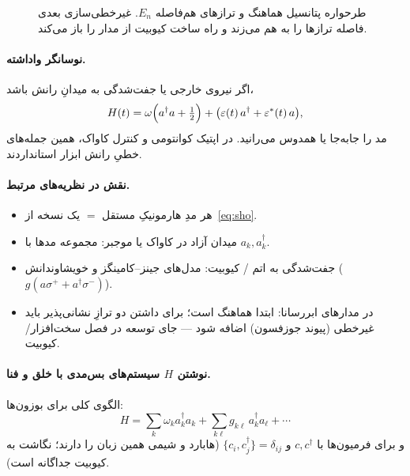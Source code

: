 \begin{figure}[htbp]
	\centering
	\begin{latin}
		\resizebox{0.55\textwidth}{!}{%
		}
	\end{latin}
	\caption{طرحواره پتانسیل هماهنگ و ترازهای هم‌فاصله $E_n$. غیرخطی‌سازی بعدی فاصله ترازها را به هم می‌زند و راه ساخت کیوبیت از مدار را باز می‌کند.}
	\label{fig:harmonic-osc}
\end{figure}

\paragraph{نوسانگر واداشته.}
اگر نیروی خارجی یا جفت‌شدگی به میدانِ رانش باشد،
\begin{equation}
	H(t)=\omega\Bigl(a^\dagger a+\tfrac12\Bigr)+\bigl(\varepsilon(t)\,a^\dagger+\varepsilon^*(t)\,a\bigr),
\end{equation}
مد را جابه‌جا یا همدوس می‌رانید. در اپتیک کوانتومی و کنترل کاواک، همین جمله‌های خطیِ رانش ابزار استانداردند.

\paragraph{نقش در نظریه‌های مرتبط.}
\begin{itemize}
	\item هر مدِ هارمونیکِ مستقل $=$ یک نسخه از~\eqref{eq:sho}.
	\item میدان آزاد در کاواک یا موجبر: مجموعه مدها با $a_k,a_k^\dagger$.
	\item جفت‌شدگی به اتم / کیوبیت: مدل‌های جینز--کامینگز و خویشاوندانش ($g(a\sigma^++a^\dagger\sigma^-)$).
	\item در مدارهای ابررسانا: ابتدا  هماهنگ است؛ برای داشتن دو ترازِ نشانی‌پذیر باید غیرخطی (پیوند جوزفسون) اضافه شود --- جای توسعه در فصل سخت‌افزار/کیوبیت.
\end{itemize}

\paragraph{نوشتن $H$ سیستم‌های بس‌مدی با خلق و فنا.}
الگوی کلی برای بوزون‌ها:
\begin{equation}
	H
	=
	\sum_k \omega_k a_k^\dagger a_k
	+
	\sum_{k\ell} g_{k\ell}\,a_k^\dagger a_\ell
	+
	\cdots
\end{equation}
و برای فرمیون‌ها با $c,c^\dagger$ و $\{c_i,c_j^\dagger\}=\delta_{ij}$ (هابارد و شیمی همین زبان را دارند؛ نگاشت به کیوبیت جداگانه است).

